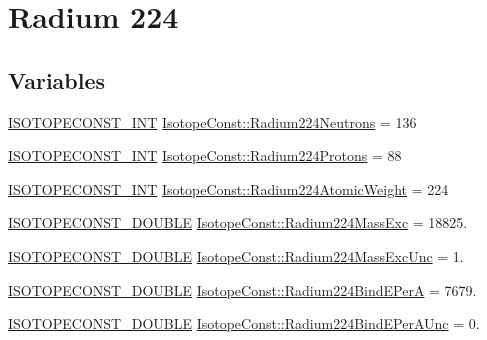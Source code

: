 \hypertarget{group___isotope_const-_radium-_ra224}{}\section{Radium 224}
\label{group___isotope_const-_radium-_ra224}
\subsection*{Variables}
\begin{DoxyCompactItemize}
\item 
\mbox{\hyperlink{group___isotope_const-_macros_ga5f18360b3e99483a35c32d789e62621c}{I\+S\+O\+T\+O\+P\+E\+C\+O\+N\+S\+T\+\_\+\+I\+NT}} \mbox{\hyperlink{group___isotope_const-_radium-_ra224_ga1117395d2f60073e2d8ad8de552a2b19}{Isotope\+Const\+::\+Radium224\+Neutrons}} = 136
\item 
\mbox{\hyperlink{group___isotope_const-_macros_ga5f18360b3e99483a35c32d789e62621c}{I\+S\+O\+T\+O\+P\+E\+C\+O\+N\+S\+T\+\_\+\+I\+NT}} \mbox{\hyperlink{group___isotope_const-_radium-_ra224_ga6ebc513a8ffb9a5fb74d5af81f2d2cd4}{Isotope\+Const\+::\+Radium224\+Protons}} = 88
\item 
\mbox{\hyperlink{group___isotope_const-_macros_ga5f18360b3e99483a35c32d789e62621c}{I\+S\+O\+T\+O\+P\+E\+C\+O\+N\+S\+T\+\_\+\+I\+NT}} \mbox{\hyperlink{group___isotope_const-_radium-_ra224_ga1565daf5de46c38f2c73bb2723e1af36}{Isotope\+Const\+::\+Radium224\+Atomic\+Weight}} = 224
\item 
\mbox{\hyperlink{group___isotope_const-_macros_ga8f45a7272ce02c0b4c65c44636ed719a}{I\+S\+O\+T\+O\+P\+E\+C\+O\+N\+S\+T\+\_\+\+D\+O\+U\+B\+LE}} \mbox{\hyperlink{group___isotope_const-_radium-_ra224_ga57e870e2f68de736b3563a5dfba918ad}{Isotope\+Const\+::\+Radium224\+Mass\+Exc}} = 18825.
\item 
\mbox{\hyperlink{group___isotope_const-_macros_ga8f45a7272ce02c0b4c65c44636ed719a}{I\+S\+O\+T\+O\+P\+E\+C\+O\+N\+S\+T\+\_\+\+D\+O\+U\+B\+LE}} \mbox{\hyperlink{group___isotope_const-_radium-_ra224_ga7f70cd98031a2c4f5ca0da89a2c5840b}{Isotope\+Const\+::\+Radium224\+Mass\+Exc\+Unc}} = 1.
\item 
\mbox{\hyperlink{group___isotope_const-_macros_ga8f45a7272ce02c0b4c65c44636ed719a}{I\+S\+O\+T\+O\+P\+E\+C\+O\+N\+S\+T\+\_\+\+D\+O\+U\+B\+LE}} \mbox{\hyperlink{group___isotope_const-_radium-_ra224_ga1343ba1d7e0288d0e578c72b4bdce20c}{Isotope\+Const\+::\+Radium224\+Bind\+E\+PerA}} = 7679.
\item 
\mbox{\hyperlink{group___isotope_const-_macros_ga8f45a7272ce02c0b4c65c44636ed719a}{I\+S\+O\+T\+O\+P\+E\+C\+O\+N\+S\+T\+\_\+\+D\+O\+U\+B\+LE}} \mbox{\hyperlink{group___isotope_const-_radium-_ra224_ga50900ad58ebe256db12ecc5488095ef2}{Isotope\+Const\+::\+Radium224\+Bind\+E\+Per\+A\+Unc}} = 0.

\end{DoxyCompactItemize}
